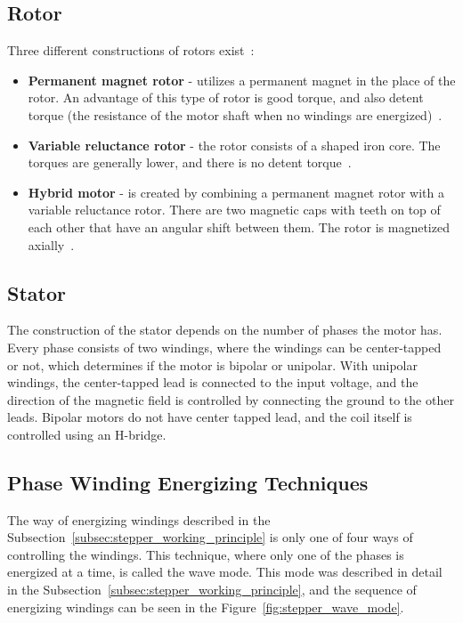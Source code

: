 \subsection{Rotor}
\label{subsec:rotor}
Three different constructions of rotors exist~\cite{carmine_fiore_stepper_2021}:
\begin{itemize}
    \item \textbf{Permanent magnet rotor} - utilizes a permanent magnet in the place of the rotor.
    An advantage of this type of rotor is good torque, and also detent torque (the resistance of the motor shaft when no windings are energized)~\cite{carmine_fiore_stepper_2021}.
    \item \textbf{Variable reluctance rotor} - the rotor consists of a shaped iron core.
    The torques are generally lower, and there is no detent torque~\cite{carmine_fiore_stepper_2021}.
    \item \textbf{Hybrid motor} - is created by combining a permanent magnet rotor with a variable reluctance rotor.
    There are two magnetic caps with teeth on top of each other that have an angular shift between them.
    The rotor is magnetized axially~\cite{carmine_fiore_stepper_2021}.
\end{itemize}

\subsection{Stator}
\label{subsec:stator}
The construction of the stator depends on the number of phases the motor has.
Every phase consists of two windings, where the windings can be center-tapped or not, which determines if the motor is bipolar or unipolar.
With unipolar windings, the center-tapped lead is connected to the input voltage, and the direction of the magnetic field is controlled by connecting the ground to the other leads.
Bipolar motors do not have center tapped lead, and the coil itself is controlled using an H-bridge.

\subsection{Phase Winding Energizing Techniques}
\label{subsec:winding_tech}
The way of energizing windings described in the Subsection~\ref{subsec:stepper_working_principle} is only one of four ways of controlling the windings.
This technique, where only one of the phases is energized at a time, is called the wave mode.
This mode was described in detail in the Subsection~\ref{subsec:stepper_working_principle}, and the sequence of energizing windings can be seen in the Figure~\ref{fig:stepper_wave_mode}.


